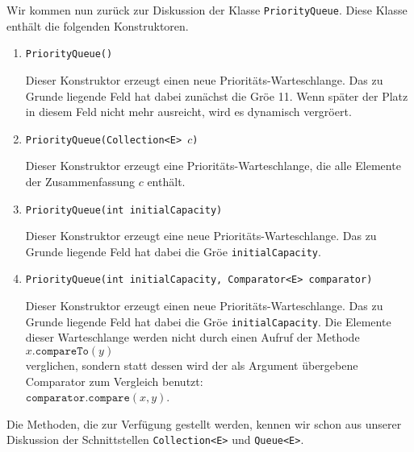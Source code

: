 Wir kommen nun zur\"uck zur Diskussion der Klasse \texttt{PriorityQueue}.
Diese Klasse enth\"alt die folgenden Konstruktoren.
\begin{enumerate}
\item \texttt{PriorityQueue()}

      Dieser Konstruktor erzeugt einen neue Priorit\"ats-Warteschlange.
      Das zu Grunde liegende Feld hat dabei zun\"achst die Gr\"o\3e 11.
      Wenn sp\"ater der Platz in diesem Feld nicht mehr ausreicht, wird es dynamisch
      vergr\"o\3ert. 
\item \texttt{PriorityQueue(Collection<E> $c$)}
  
      Dieser Konstruktor erzeugt eine Priorit\"ats-Warteschlange, die alle Elemente der
      Zusammenfassung $c$ enth\"alt.
\item \texttt{PriorityQueue(int initialCapacity)}
  
      Dieser Konstruktor  erzeugt eine neue Priorit\"ats-Warteschlange.
      Das zu Grunde liegende Feld hat dabei die Gr\"o\3e \texttt{initialCapacity}.
\item \texttt{PriorityQueue(int initialCapacity, Comparator<E> comparator)}

      Dieser Konstruktor  erzeugt einen neue Priorit\"ats-Warteschlange.
      Das zu Grunde liegende Feld hat dabei die Gr\"o\3e \texttt{initialCapacity}.
      Die Elemente dieser Warteschlange werden nicht durch einen Aufruf der
      Methode 
      \\[0.2cm]
      \hspace*{1.3cm}
      $x.\texttt{compareTo}(y)$ 
      \\[0.2cm]
      verglichen, sondern statt dessen wird der als Argument \"ubergebene Comparator
      zum Vergleich benutzt:
      \\[0.2cm]
      \hspace*{1.3cm}
      $\mathtt{comparator}.\texttt{compare}(x,y)$. 
\end{enumerate}
Die Methoden, die zur Verf\"ugung gestellt werden, kennen wir schon aus unserer Diskussion
der Schnittstellen \texttt{Collection<E>} und \texttt{Queue<E>}. 
